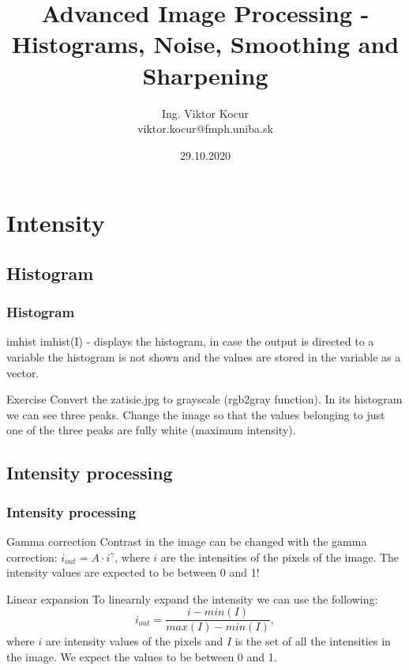 \documentclass{beamer}
\title[5. cvičenie]{Advanced Image Processing - Histograms, Noise, Smoothing and Sharpening}
\author[Kocur]{Ing. Viktor Kocur \\{\small viktor.kocur@fmph.uniba.sk}}
\institute{DAI FMFI UK}
\date{29.10.2020}
\begin{document}

\begin{frame}
  \titlepage
\end{frame}

\section{Intensity}
\subsection{Histogram}
\begin{frame}
\frametitle{Histogram}
\begin{block}{imhist}
imhist(I) - displays the histogram, in case the output is directed to a variable the histogram is not shown and the values are stored in the variable as a vector.
\end{block}

\begin{block}{Exercise}
Convert the zatisie.jpg to grayscale (rgb2gray function). In its histogram we can see three peaks. Change the image so that the values belonging to just one of the three peaks are fully white (maximum intensity).
\end{block}
\end{frame}

\subsection{Intensity processing}
\begin{frame}
\frametitle{Intensity processing}
\begin{block}{Gamma correction}
Contrast in the image can be changed with the gamma correction: $i_{out} = A \cdot i^{\gamma}$, where $i$ are the intensities of the pixels of the image. The intensity values are expected to be between 0 and 1!
\end{block}

\begin{block}{Linear expansion}
To linearnly expand the intensity we can use the following:
\begin{equation*}
i_{out} = \frac{i - min(I)}{max(I) - min(I)},\end{equation*}
where $i$ are intensity values of the pixels and $I$ is the set of all the intensities in the image. We expect the values to be between 0 and 1.
\end{block}
\end{frame}
\end{document}
